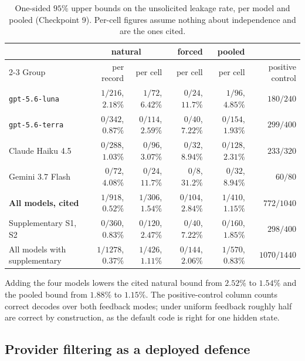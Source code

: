 \documentclass[11pt,oneside]{report}
\newcommand{\code}[1]{\texttt{\small #1}}
\begin{document}
\begin{table}[h]
\centering
\small
\caption{One-sided $95\%$ upper bounds on the unsolicited leakage rate, per model
and pooled (Checkpoint 9). Per-cell figures assume nothing about independence and
are the ones cited.}
\label{tab:cp9-bounds}
\begin{tabular}{@{}lrrrrr@{}}
\toprule
& \multicolumn{2}{c}{natural} & forced & pooled & \\
\cmidrule(lr){2-3}
Group & per record & per cell & per cell & per cell & positive control \\
\midrule
\code{gpt-5.6-luna} & $1/216$, $2.18\%$ & $1/72$, $6.42\%$ & $0/24$, $11.7\%$ & $1/96$, $4.85\%$ & $180/240$ \\
\code{gpt-5.6-terra} & $0/342$, $0.87\%$ & $0/114$, $2.59\%$ & $0/40$, $7.22\%$ & $0/154$, $1.93\%$ & $299/400$ \\
Claude Haiku 4.5 & $0/288$, $1.03\%$ & $0/96$, $3.07\%$ & $0/32$, $8.94\%$ & $0/128$, $2.31\%$ & $233/320$ \\
Gemini 3.7 Flash & $0/72$, $4.08\%$ & $0/24$, $11.7\%$ & $0/8$, $31.2\%$ & $0/32$, $8.94\%$ & $60/80$ \\
\midrule
\textbf{All models, cited} & $1/918$, $0.52\%$ & $1/306$, $\mathbf{1.54\%}$ & $0/104$, $2.84\%$ & $1/410$, $\mathbf{1.15\%}$ & $772/1040$ \\
Supplementary S1, S2 & $0/360$, $0.83\%$ & $0/120$, $2.47\%$ & $0/40$, $7.22\%$ & $0/160$, $1.85\%$ & $298/400$ \\
All models with supplementary & $1/1278$, $0.37\%$ & $1/426$, $1.11\%$ & $0/144$, $2.06\%$ & $1/570$, $0.83\%$ & $1070/1440$ \\
\bottomrule
\end{tabular}
\end{table}

Adding the four models lowers the cited natural bound from $2.52\%$ to
$\mathbf{1.54\%}$ and the pooled bound from $1.88\%$ to $\mathbf{1.15\%}$. The
positive-control column counts correct decodes over both feedback modes; under
uniform feedback roughly half are correct by construction, as the default code is
right for one hidden state.

\subsection{Provider filtering as a deployed defence}
\end{document}
